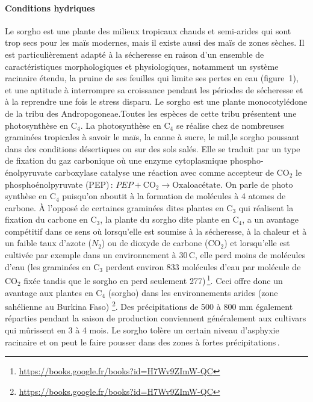 \documentclass[a4paper,11pt]{article}
\begin{document}
\paragraph{Conditions hydriques} Le sorgho est une plante des milieux
tropicaux chauds et semi-arides qui sont trop secs pour les maïs
modernes, mais il existe aussi des maïs de zones sèches. Il est
particulièrement adapté à la sécheresse en raison d’un ensemble de
caractéristiques morphologiques et physiologiques, notamment un
système racinaire étendu, la pruine de ses feuilles qui limite ses
pertes en eau (figure~1), et une aptitude à interrompre sa croissance
pendant les périodes de sécheresse et à la reprendre une fois le
stress disparu. Le sorgho est une plante monocotylédone de la tribu
des Andropogoneae.Toutes les espèces de cette tribu présentent une
photosynthèse en $\text{C}_4$. La photosynthèse en $\text{C}_4$ se
réalise chez de nombreuses graminées tropicales à savoir le maïs, la
canne à sucre, le mil,le sorgho poussant dans des conditions
désertiques ou sur des sols salés. Elle se traduit par un type de
fixation du gaz carbonique où une enzyme cytoplasmique
phospho-énolpyruvate carboxylase catalyse une réaction avec comme
accepteur de $\text{CO}_2$ le phosphoénolpyruvate (PEP)\,: $PEP +
\text{CO}_2 \longrightarrow \text{Oxaloacétate}$. On parle de photo
synthèse en $\text{C}_4$ puisqu'on aboutit à la formation de molécules
à 4 atomes de carbone. À l’opposé de certaines graminées dites plantes
en $\text{C}_3$ qui réalisent la fixation du carbone en $\text{C}_3$,
la plante du sorgho dite plante en $\text{C}_4$, a un avantage
compétitif dans ce sens où lorsqu’elle est soumise à la sécheresse, à
la chaleur et à un faible taux d’azote ($N_2$) ou de dioxyde de
carbone ($\text{CO}_2$) et lorsqu’elle est cultivée par exemple dans
un environnement à 30\,\degree{}C, elle perd moins de molécules d’eau
(les graminées en $\text{C}_3$ perdent environ 833 molécules d’eau par
molécule de $\text{CO}_2$ fixée tandis que le sorgho en perd seulement
277)\,\footnote{\url{https://books.google.fr/books?id=H7Wv9ZImW-QC}}. Ceci
offre donc un avantage aux plantes en $\text{C}_4$ (sorgho) dans les
environnements arides (zone sahélienne au Burkina Faso)
\footnote{\url{https://books.google.fr/books?id=H7Wv9ZImW-QC}}. Des
 précipitations de 500 à 800 mm également réparties pendant la saison
 de production conviennent généralement aux cultivars qui mûrissent
 en 3 à 4 mois. Le sorgho tolère un certain niveau d’asphyxie
 racinaire et on peut le faire pousser dans des zones à fortes
 précipitations\,\cite{BARRO_KONDOMBO_2010}.
\end{document}

